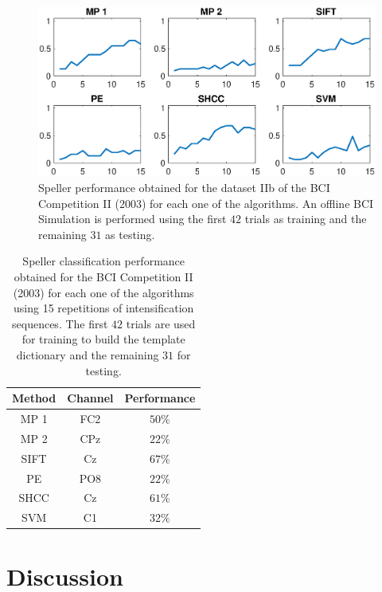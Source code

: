 \documentclass[brainsci,article,submit,moreauthors,pdftex,10pt,a4paper]{mdpi}
\begin{document}
\begin{figure}[H]
\centering
\includegraphics[width=15cm]{images/PerformanceBCICompetition.eps}
\caption{Speller performance obtained for the dataset IIb of the BCI Competition II (2003) for each one of the algorithms.  An offline BCI Simulation is performed using the first $42$ trials as training and the remaining $31$ as testing.}
\label{fig:performancebcicompetition}
\end{figure}


\begin{table}[H]
\caption{Speller classification performance obtained for the BCI Competition II (2003) for each one of the algorithms using 15 repetitions of intensification sequences. The first $42$ trials are used for training to build the template dictionary and the remaining $31$ for testing. }
\centering
\begin{tabular}{ccc}
\toprule
\textbf{Method}	& \textbf{Channel} &  \textbf{Performance} \\
\midrule
MP 1 & FC2  & $50\%$ \\
MP 2 & CPz & $22\%$ \\
SIFT  & Cz & $67\%$ \\
PE     & PO8 & $22\%$ \\
SHCC & Cz & $61\%$ \\
SVM     & C1  & $32\%$ \\
\bottomrule
\end{tabular}
\label{tab:results}
\end{table}

\section{Discussion}
\label{section:discussion}
\end{document}
